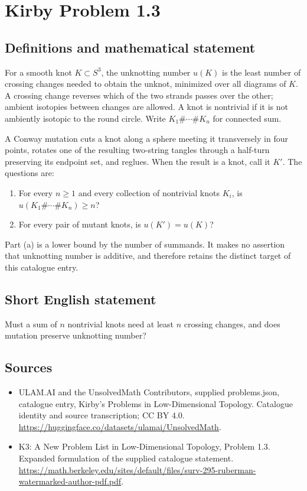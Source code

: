 \documentclass[11pt,a4paper]{article}
\begin{document}
\section*{Kirby Problem 1.3}\label{statement}

\subsection{Definitions and mathematical statement}
For a smooth knot $K\subset S^3$, the unknotting number $u(K)$ is the least number
of crossing changes needed to obtain the unknot, minimized over all diagrams of
$K$. A crossing change reverses which of the two strands passes over the other;
ambient isotopies between changes are allowed. A knot is nontrivial if it is not
ambiently isotopic to the round circle. Write $K_1\#\cdots\#K_n$ for connected sum.

A Conway mutation cuts a knot along a sphere meeting it transversely in four
points, rotates one of the resulting two-string tangles through a half-turn
preserving its endpoint set, and reglues. When the result is a knot, call it $K'$.
The questions are:
\begin{enumerate}
\item For every $n\geq1$ and every collection of nontrivial knots $K_i$, is
$u(K_1\#\cdots\#K_n)\geq n$?
\item For every pair of mutant knots, is $u(K')=u(K)$?
\end{enumerate}
Part (a) is a lower bound by the number of summands. It makes no assertion that
unknotting number is additive, and therefore retains the distinct target of this
catalogue entry.
\subsection{Short English statement}
Must a sum of $n$ nontrivial knots need at least $n$ crossing changes, and does mutation preserve unknotting number?
\subsection{Sources}
\begin{itemize}
\item[S1] ULAM.AI and the UnsolvedMath Contributors, supplied problems.json, catalogue entry, Kirby's Problems in Low-Dimensional Topology. Catalogue identity and source transcription; CC BY 4.0.
\url{https://huggingface.co/datasets/ulamai/UnsolvedMath}.
\item[S2] K3: A New Problem List in Low-Dimensional Topology, Problem 1.3. Expanded formulation of the supplied catalogue statement.
\url{https://math.berkeley.edu/sites/default/files/surv-295-ruberman-watermarked-author-pdf.pdf}.
\end{itemize}
\end{document}

